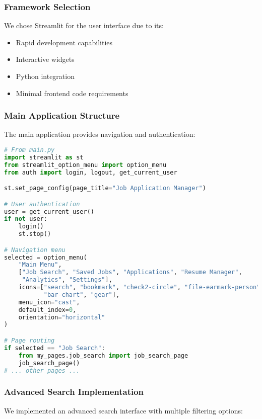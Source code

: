 \documentclass[12pt,a4paper]{article}
\begin{document}
\subsubsection{Framework Selection}
We chose Streamlit for the user interface due to its:
\begin{itemize}
    \item Rapid development capabilities
    \item Interactive widgets
    \item Python integration
    \item Minimal frontend code requirements
\end{itemize}

\subsubsection{Main Application Structure}
The main application provides navigation and authentication:

\begin{lstlisting}[language=Python, caption=Main Streamlit Application]
# From main.py
import streamlit as st
from streamlit_option_menu import option_menu
from auth import login, logout, get_current_user

st.set_page_config(page_title="Job Application Manager")

# User authentication
user = get_current_user()
if not user:
    login()
    st.stop()

# Navigation menu
selected = option_menu(
    "Main Menu",
    ["Job Search", "Saved Jobs", "Applications", "Resume Manager", 
     "Analytics", "Settings"],
    icons=["search", "bookmark", "check2-circle", "file-earmark-person", 
           "bar-chart", "gear"],
    menu_icon="cast",
    default_index=0,
    orientation="horizontal"
)

# Page routing
if selected == "Job Search":
    from my_pages.job_search import job_search_page
    job_search_page()
# ... other pages ...
\end{lstlisting}

\subsubsection{Advanced Search Implementation}
We implemented an advanced search interface with multiple filtering options:
\end{document}
